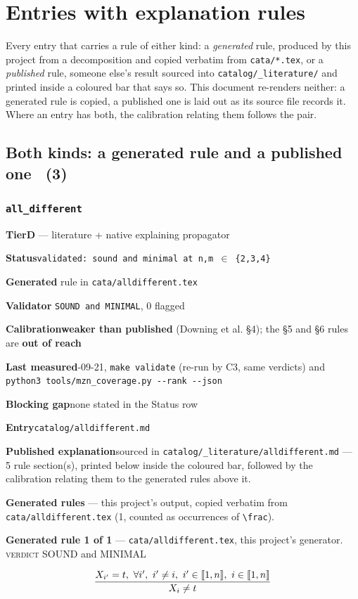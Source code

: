 \documentclass[10pt,a4paper]{article}
\newcommand{\entryfield}[2]{{\raggedright\textbf{#1}\quad #2\par}}
\newcommand{\rulebox}[1]{%
  \[\resizebox{\ifdim\width>\linewidth\linewidth\else\width\fi}{!}%
    {$\displaystyle #1$}\]}
\begin{document}
\section{Entries with explanation rules}
Every entry that carries a rule of either kind: a \emph{generated} rule, produced by this project from a decomposition and copied verbatim from \texttt{cata/*.tex}, or a \emph{published} rule, someone else's result sourced into \texttt{catalog/\_literature/} and printed inside a coloured bar that says so. This document re-renders neither: a generated rule is copied, a published one is laid out as its source file records it. Where an entry has both, the calibration relating them follows the pair.
\subsection*{Both kinds: a generated rule and a published one \ \normalsize(3)}
\subsubsection*{\texttt{all\_\allowbreak{}different}}
\label{entry:alldifferent}
\entryfield{Tier}{\textbf{D} --- literature + native explaining propagator}
\entryfield{Status}{\texttt{validated: sound and minimal at n,m $\in$ \{2,3,4\}}}
\entryfield{Generated}{1 rule in \texttt{cata/alldifferent.tex}}
\entryfield{Validator}{1 \texttt{SOUND and MINIMAL}, 0 flagged}
\entryfield{Calibration}{\textbf{weaker than published} (Downing et al. \S{}4); the \S{}5 and \S{}6 rules are \textbf{out of reach}}
\entryfield{Last measured}{2026-09-21, \texttt{make validate} (re-run by C3, same verdicts) and \texttt{python3 tools/\allowbreak{}mzn\_\allowbreak{}coverage.\allowbreak{}py -\allowbreak{}-\allowbreak{}rank -\allowbreak{}-\allowbreak{}json}}
\entryfield{Blocking gap}{none stated in the Status row}
\entryfield{Entry}{\texttt{catalog/alldifferent.md}}
\entryfield{Published explanation}{sourced in \texttt{catalog/\_\allowbreak{}literature/alldifferent.md} --- 5 rule section(s), printed below inside the coloured bar, followed by the calibration relating them to the generated rules above it.}

\textbf{Generated rules} --- this project's output, copied verbatim from \texttt{cata/alldifferent.tex} (1, counted as occurrences of \texttt{\textbackslash{}frac}).\par

{\small\textbf{Generated rule 1 of 1} --- \texttt{cata/alldifferent.tex}, this project's generator. \textsc{verdict} SOUND and MINIMAL\par}
\rulebox{\frac{X_{i'}=t,~\forall i',~i' \neq i,~i' \in \llbracket1,n\rrbracket,~i \in \llbracket1,n\rrbracket}{X_{i} \neq t}}
\end{document}
